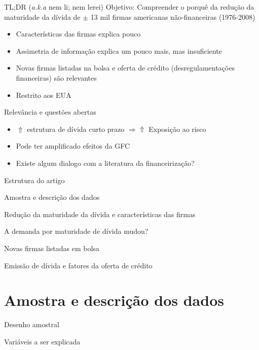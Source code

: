 \documentclass[presentation]{beamer}
\begin{document}
\begin{frame}[label={sec:org6eb3b19}]{TL;DR (\emph{a.k.a} nem li; nem lerei)}
\alert{Objetivo:} Compreender o porquê da redução da maturidade da dívida de \(\pm\) 13 mil firmas americanas não-financeiras (1976-2008)
\begin{itemize}
\item Características das firmas explica pouco
\item Assimetria de informação explica um pouco mais, mas insuficiente
\item Novas firmas listadas na bolsa e oferta de crédito (desregulamentações financeiras) são relevantes
\item Restrito aos EUA
\end{itemize}


\begin{block}{Relevância e questões abertas}
\begin{itemize}
\item \(\Uparrow\) estrutura de dívida  curto prazo \(\Rightarrow \Uparrow\) Exposição ao risco
\item Pode ter amplificado efeitos da GFC
\item Existe algum dialogo com a literatura da financeirização?
\end{itemize}
\end{block}
\end{frame}


\begin{frame}[label={sec:orgbfb61a4}]{Estrutura do artigo}
\begin{block}{Amostra e descrição dos dados}
\end{block}
\begin{block}{Redução da maturidade da dívida e características das firmas}
\end{block}
\begin{block}{A demanda por maturidade de dívida mudou?}
\end{block}
\begin{block}{Novas firmas listadas em bolsa}
\end{block}
\begin{block}{Emissão de dívida e fatores da oferta de crédito}
\end{block}
\end{frame}
\section{Amostra e descrição dos dados}
\label{sec:org9a953e9}
\begin{frame}[label={sec:org85fc5b3}]{Desenho amostral}
\end{frame}
\begin{frame}[label={sec:org4634a17}]{Variáveis a ser explicada}
\end{frame}
\end{document}

